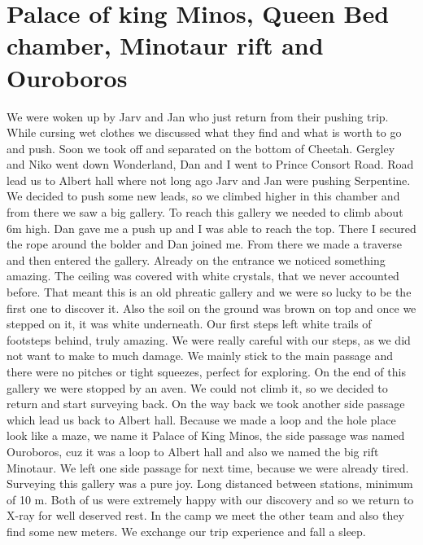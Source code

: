 
\section{Palace of king Minos, Queen Bed chamber, Minotaur rift and
Ouroboros}\label{palace-of-king-minos-queen-bed-chamber-minotaur-rift-and-ouroboros}

We were woken up by Jarv and Jan who just return from their pushing
trip. While cursing wet clothes we discussed what they find and what is
worth to go and push. Soon we took off and separated on the bottom of
Cheetah. Gergley and Niko went down Wonderland, Dan and I went to Prince
Consort Road. Road lead us to Albert hall where not long ago Jarv and
Jan were pushing Serpentine. We decided to push some new leads, so we
climbed higher in this chamber and from there we saw a big gallery. To
reach this gallery we needed to climb about 6m high. Dan gave me a push
up and I was able to reach the top. There I secured the rope around the
bolder and Dan joined me. From there we made a traverse and then entered
the gallery. Already on the entrance we noticed something amazing. The
ceiling was covered with white crystals, that we never accounted before.
That meant this is an old phreatic gallery and we were so lucky to be
the first one to discover it. Also the soil on the ground was brown on
top and once we stepped on it, it was white underneath. Our first steps
left white trails of footsteps behind, truly amazing. We were really
careful with our steps, as we did not want to make to much damage. We
mainly stick to the main passage and there were no pitches or tight
squeezes, perfect for exploring. On the end of this gallery we were
stopped by an aven. We could not climb it, so we decided to return and
start surveying back. On the way back we took another side passage which
lead us back to Albert hall. Because we made a loop and the hole place
look like a maze, we name it Palace of King Minos, the side passage was
named Ouroboros, cuz it was a loop to Albert hall and also we named the
big rift Minotaur. We left one side passage for next time, because we
were already tired. Surveying this gallery was a pure joy. Long
distanced between stations, minimum of 10 m. Both of us were extremely
happy with our discovery and so we return to X-ray for well deserved
rest. In the camp we meet the other team and also they find some new
meters. We exchange our trip experience and fall a sleep.

